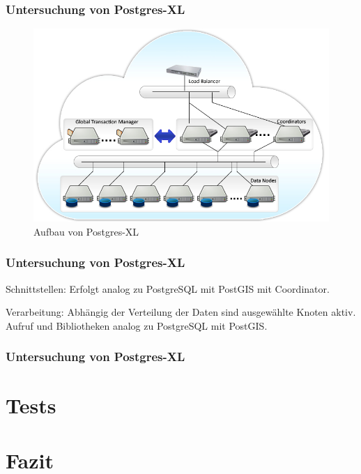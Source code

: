 \documentclass{beamer}
\begin{document}
%
\begin{frame}\frametitle{Untersuchung von Postgres-XL}

\begin{figure}
\centering
\includegraphics[width=1\hsize]{../Abbildungen/postgresxl-structure.jpg}
\caption{Aufbau von Postgres-XL}
\end{figure}
\end{frame}

\begin{frame}\frametitle{Untersuchung von Postgres-XL}
\begin{block}{Schnittstellen:}
Erfolgt analog zu PostgreSQL mit PostGIS mit Coordinator.
\end{block}

\vspace{\baselineskip}
\vspace{\baselineskip}

\begin{block}{Verarbeitung:}
Abhängig der Verteilung der Daten sind ausgewählte Knoten aktiv.\\
Aufruf und Bibliotheken analog zu PostgreSQL mit PostGIS.
\end{block}

\end{frame}

\begin{frame}\frametitle{Untersuchung von Postgres-XL}


\end{frame}

\section{Tests}

\section{Fazit}
 
\begin{frame}\frametitle{}


\end{frame}
\end{document}
